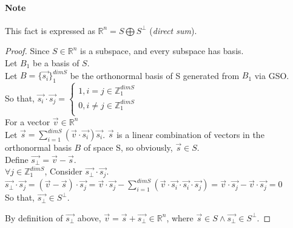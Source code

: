 \documentclass[11pt]{article}
\newcommand{\re}[1]{\mathbb{R}^#1}
\begin{document}
	\paragraph{Note} This fact is expressed as $\re{n} = S \bigoplus S^\perp$ (\emph{direct sum}).
	\begin{proof}
		Since $S \in \re{n}$ is a subspace, and every subspace has basis. \\
		Let $B_1$ be a basis of $S$. \\
		Let $B = \{\vec{s_i}\}_1^{dimS}$ be the orthonormal basis of S generated from $B_1$ via GSO. \\
		
		So that, $\vec{s_i} \cdot \vec{s_j} = \begin{cases}
 			1, i = j \in \mathbb{Z}_1^{dimS} \\
 			0, i \neq j \in \mathbb{Z}_1^{dimS} \\ 
 			\end{cases}$ \\
 			
 		For a vector $\vec{v} \in \re{n}$ \\
 	
 		Let $\vec{s} = \sum_{i=1}^{dimS} (\vec{v} \cdot \vec{s_i})\vec{s_i}$. $\vec{s}$ is a linear combination of vectors in the orthonormal basis $B$ of space S, so obviously, $\vec{s} \in S$.\\
 	
		Define $\vec{s_{\perp}} = \vec{v} - \vec{s}$.\\
		
		$\forall j \in \mathbb{Z}_1^{dimS}$, Consider $\vec{s_\perp} \cdot \vec{s_j}.$ \\
		
		$\vec{s_\perp} \cdot \vec{s_j} = (\vec{v} - \vec{s}) \cdot \vec{s_j} = \vec{v} \cdot \vec{s_j} - \sum_{i=1}^{dimS}(\vec{v} \cdot \vec{s_i} \cdot \vec{s_i} \cdot \vec{s_j}) = \vec{v} \cdot \vec{s_j} - \vec{v} \cdot \vec{s_j} = 0$ \\
		
		So that, $\vec{s_\perp} \in S^\perp$.
		
		By definition of $\vec{s_\perp}$ above, $\vec{v} = \vec{s} + \vec{s_\perp} \in \re{n}$, where $\vec{s} \in S \land \vec{s_\perp} \in S^\perp$. 
	\end{proof}
\end{document}
